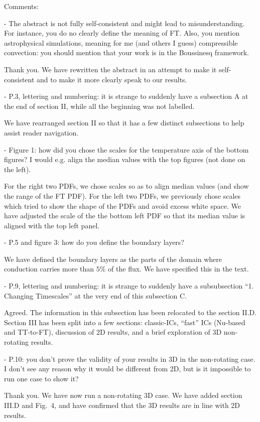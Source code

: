 \documentclass[aps, 11pt, singlecolumn]{revtex4-1} %
\begin{document}
\begin{singlespace}
\begin{myquotation}
Comments:

-       The abstract is not fully self-consistent and might lead to misunderstanding.
For instance, you do no clearly define the meaning of FT. 
Also, you mention astrophysical simulations, meaning for me (and others I guess) compressible convection: you should mention that your work is in the Boussinesq framework.
\end{myquotation}
Thank you.
We have rewritten the abstract in an attempt to make it self-consistent and to make it more clearly speak to our results.
\begin{myquotation}
-       P.3, lettering and numbering: it is strange to suddenly have a subsection A at the end of section II, while all the beginning was not labelled.
\end{myquotation}
We have rearranged section II so that it has a few distinct subsections to help assist reader navigation.
\begin{myquotation}
-       Figure 1: how did you chose the scales for the temperature axis of the bottom figures? 
I would e.g. align the median values with the top figures (not done on the left).
\end{myquotation}
For the right two PDFs, we chose scales so as to align median values (and show the range of the FT PDF).
For the left two PDFs, we previously chose scales which tried to show the shape of the PDFs and avoid excess white space.
We have adjusted the scale of the the bottom left PDF so that its median value is aligned with the top left panel.
\begin{myquotation}
-       P.5 and figure 3: how do you define the boundary layers?
\end{myquotation}
We have defined the boundary layers as the parts of the domain where conduction carries more than $5\%$ of the flux.
We have specified this in the text.
\begin{myquotation}
-       P.9, lettering and numbering: it is strange to suddenly have a subsubsection “1. Changing Timescales” at the very end of this subsection C.
\end{myquotation}
Agreed.
The information in this subsection has been relocated to the section II.D.
Section III has been split into a few sections: classic-ICs, ``fast'' ICs (Nu-based and TT-to-FT), discussion of 2D results, and a brief exploration of 3D non-rotating results.

\begin{myquotation}
-       P.10: you don’t prove the validity of your results in 3D in the non-rotating case. 
I don’t see any reason why it would be different from 2D, but is it impossible to run one case to show it?
\end{myquotation}
Thank you.
We have now run a non-rotating 3D case.
We have added section III.D and Fig.~4, and have confirmed that the 3D results are in line with 2D results.


\end{singlespace}
\end{document}
